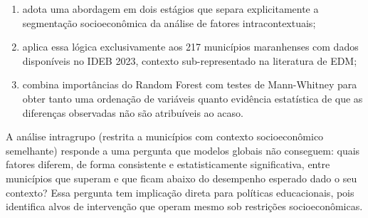 \begin{enumerate}[label=\alph*)]
    \item adota uma abordagem em dois estágios que separa explicitamente a segmentação socioeconômica da análise de fatores intracontextuais;
    \item aplica essa lógica exclusivamente aos 217 municípios maranhenses com dados disponíveis no IDEB 2023, contexto sub-representado na literatura de EDM;
    \item combina importâncias do Random Forest \cite{breiman2001} com testes de Mann-Whitney \cite{mannwhitney1947} para obter tanto uma ordenação de variáveis quanto evidência estatística de que as diferenças observadas não são atribuíveis ao acaso.
\end{enumerate}

A análise intragrupo (restrita a municípios com contexto socioeconômico semelhante) responde a uma pergunta que modelos globais não conseguem: quais fatores diferem, de forma consistente e estatisticamente significativa, entre municípios que superam e que ficam abaixo do desempenho esperado dado o seu contexto? Essa pergunta tem implicação direta para políticas educacionais, pois identifica alvos de intervenção que operam mesmo sob restrições socioeconômicas.